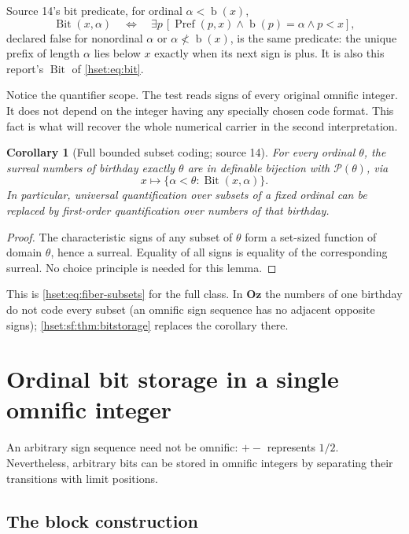 \documentclass[11pt,letterpaper]{article}
\newtheorem{corollary}[corollary]{Corollary}\aliascntresetthe{corollary}
\theoremstyle{definition}
\theoremstyle{remark}
\newcommand{\bd}{\operatorname{b}}
\newcommand{\Bit}{\operatorname{Bit}}
\newcommand{\Pow}{\mathcal P}
\newcommand{\Oz}{\mathbf{Oz}}
\newcommand{\Prefp}{\operatorname{Pref}}
\begin{document}
Source 14's bit predicate, for ordinal $\alpha<\bd(x)$,
\begin{equation}\label{hset:sf:eq:bit}
 \Bit(x,\alpha)\quad\Longleftrightarrow\quad
 \exists p\,[\Prefp(p,x)\land\bd(p)=\alpha\land p<x],
\end{equation}
declared false for nonordinal $\alpha$ or $\alpha\not<\bd(x)$, is the same
predicate: the unique prefix of length $\alpha$ lies below $x$ exactly when its
next sign is plus. It is also this report's $\Bit$ of \eqref{hset:eq:bit}.

Notice the quantifier scope. The test reads signs of every original omnific
integer. It does not depend on the integer having any specially chosen code
format. This fact is what will recover the whole numerical carrier in the second
interpretation.

\begin{corollary}[Full bounded subset coding; source 14]\label{hset:sf:cor:subsets}
For every ordinal $\theta$, the surreal numbers of birthday exactly $\theta$ are
in definable bijection with $\Pow(\theta)$, via
\[
 x\longmapsto\{\alpha<\theta:\Bit(x,\alpha)\}.
\]
In particular, universal quantification over subsets of a fixed ordinal can be
replaced by first-order quantification over numbers of that birthday.
\end{corollary}
\begin{proof}
The characteristic signs of any subset of $\theta$ form a set-sized function of
domain $\theta$, hence a surreal. Equality of all signs is equality of the
corresponding surreal. No choice principle is needed for this lemma.
\end{proof}

This is \eqref{hset:eq:fiber-subsets} for the full class. In $\Oz$ the numbers of
one birthday do not code every subset (an omnific sign sequence has no adjacent
opposite signs); \cref{hset:sf:thm:bitstorage} replaces the corollary there.

\section{Ordinal bit storage in a single omnific integer}
\label{hset:sf:sec:blocks}

An arbitrary sign sequence need not be omnific: $+-$ represents $1/2$.
Nevertheless, arbitrary bits can be stored in omnific integers by separating their
transitions with limit positions.

\subsection{The block construction}
\end{document}
